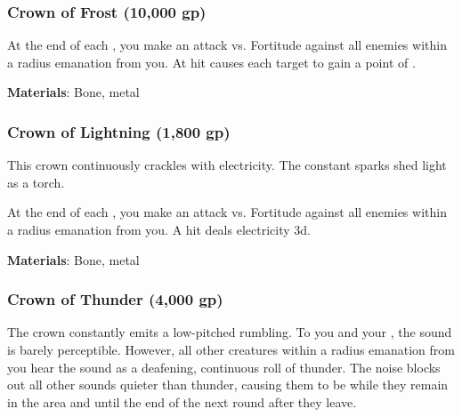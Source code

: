 \lowercase{\hypertarget{item:Crown of Frost}{}}\label{item:Crown of Frost}
\hypertarget{item:Crown of Frost}{\subsubsection{Crown of Frost\hfill{} (10,000 gp)}}

At the end of each , you make an attack vs. Fortitude against all enemies within a \areamed radius emanation from you.
At hit causes each target to gain a point of .



\vspace{0.25em}
\textbf{Materials}: Bone, metal


\lowercase{\hypertarget{item:Crown of Lightning}{}}\label{item:Crown of Lightning}
\hypertarget{item:Crown of Lightning}{\subsubsection{Crown of Lightning\hfill{} (1,800 gp)}}

This crown continuously crackles with electricity.
The constant sparks shed light as a torch.

At the end of each , you make an attack vs. Fortitude against all enemies within a \areamed radius emanation from you.
A hit deals electricity  \minus3d.



\vspace{0.25em}
\textbf{Materials}: Bone, metal


\lowercase{\hypertarget{item:Crown of Thunder}{}}\label{item:Crown of Thunder}
\hypertarget{item:Crown of Thunder}{\subsubsection{Crown of Thunder\hfill{} (4,000 gp)}}

The crown constantly emits a low-pitched rumbling.
To you and your , the sound is barely perceptible.
However, all other creatures within a \arealarge radius emanation from you hear the sound as a deafening, continuous roll of thunder.
The noise blocks out all other sounds quieter than thunder, causing them to be \deafened while they remain in the area and until the end of the next round after they leave.



